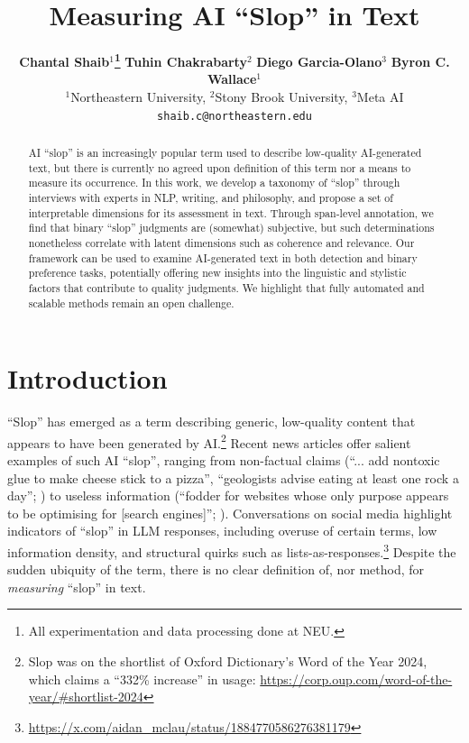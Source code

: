 \documentclass{article} %
\title{Measuring AI ``Slop'' in Text}
\author{\textbf{Chantal Shaib$^1$\thanks{All experimentation and data processing done at NEU.}}\quad\quad
\textbf{Tuhin Chakrabarty$^2$}\quad\quad
\textbf{Diego Garcia-Olano$^3$}\quad\quad
\textbf{Byron C. Wallace$^1$}\quad\quad \\
$^1$Northeastern University, $^2$Stony Brook University, $^3$Meta AI\\
\small\texttt{shaib.c@northeastern.edu}
}
\begin{document}
\maketitle
\begin{abstract}
AI ``slop'' is an increasingly popular term used to describe low-quality AI-generated text, but there is currently no agreed upon definition of this term nor a means to measure its occurrence. 
In this work, we develop a taxonomy of ``slop'' through interviews with experts in NLP, writing, and philosophy, and propose a set of interpretable dimensions for its assessment in text. 
Through span-level annotation, we find that binary ``slop'' judgments are (somewhat) subjective, but such determinations nonetheless correlate with latent dimensions such as coherence and relevance. 
Our framework can be used to examine AI-generated text in both detection and binary preference tasks, potentially offering new insights into the linguistic and stylistic factors that contribute to quality judgments. We highlight that fully automated and scalable methods remain an open challenge.
\end{abstract}

\section{Introduction}
``Slop'' has emerged as a term describing generic, low-quality content that appears to have been generated by AI.\footnote{Slop was on the shortlist of Oxford Dictionary's Word of the Year 2024, which claims a ``332\% increase'' in usage: \url{https://corp.oup.com/word-of-the-year/\#shortlist-2024}}
Recent news articles offer salient examples of such AI ``slop'', ranging from non-factual claims (``... add nontoxic glue to make cheese stick to a pizza'', ``geologists advise eating at least one rock a day''; \citealp{hoffman2024first, wallace2024}) 
to useless information (``fodder for websites whose only purpose appears to be optimising for [search engines]''; \citealp{mahdawi2025ai}).
Conversations on social media highlight indicators of ``slop'' in LLM responses, including overuse of certain terms, low information density, and structural quirks such as lists-as-responses.\footnote{\url{https://x.com/aidan_mclau/status/1884770586276381179}}
Despite the sudden ubiquity of the term, there is no clear definition of, nor method, for \textit{measuring} ``slop'' in text. 
\end{document}
